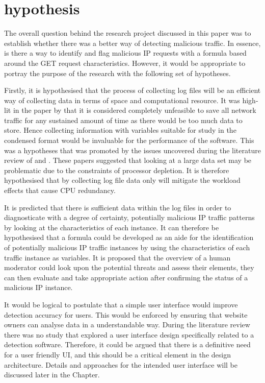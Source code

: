 \section{hypothesis}

The overall question behind the research project discussed in this paper was to establish whether there was a better way of detecting malicious traffic. In essence, is there a way to identify and flag malicious IP requests with a formula based around the GET request characteristics. However, it would be appropriate to portray the purpose of the research with the following set of hypotheses.

Firstly, it is hypothesised that the process of collecting log files will be an efficient way of collecting data in terms of space and computational resource. It was high-lit in the \citeyear{staniford2002practical} paper by \citeauthor{staniford2002practical} that it is considered completely unfeasible to save all network traffic for any sustained amount of time as there would be too much data to store. Hence collecting information with variables suitable for study in the condensed format would be invaluable for the performance of the software. This was a hypotheses that was promoted by the issues uncovered during the literature review of \cite{Adi2015} and \cite{Adi2016}. These papers suggested that looking at a large data set may be problematic due to the constraints of processor depletion. It is therefore hypothesised that by collecting log file data only will mitigate the workload effects that cause CPU redundancy.

It is predicted that there is sufficient data within the log files in order to diagnosticate with a degree of certainty, potentially malicious IP traffic patterns by looking at the characteristics of each instance.
It can therefore be hypothesised that a formula could be developed as an aide for the identification of potentially malicious IP traffic instances by using the characteristics of each traffic instance as variables. It is proposed that the overview of a human moderator could look upon the potential threats and assess their elements, they can then evaluate and take appropriate action after confirming the status of a malicious IP instance.

It would be logical to postulate that a simple user interface would improve detection accuracy for users. This would be enforced by ensuring that website owners can analyse data in a understandable way. During the literature review there was no study that explored a user interface design specifically related to a detection software. Therefore, it could be argued that there is a definitive need for a user friendly UI, and this should be a critical element in the design architecture. Details and approaches for the intended user interface will be discussed later in the Chapter.

